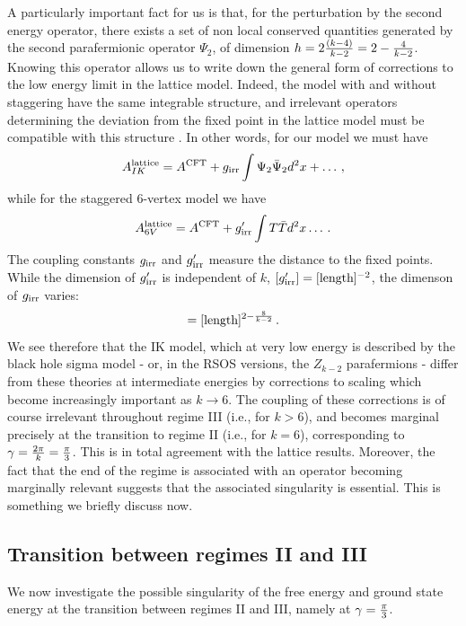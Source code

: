 \documentclass[11pt]{article}
\begin{document}
A particularly important fact for us is that, for the perturbation by the second energy operator, there exists a set of non local conserved quantities generated by the second parafermionic operator $\Psi_2$, of dimension $h=2{(k-4)\over k-2}=2-{4\over k-2}$. Knowing this operator allows us to write down the general form of corrections to the low energy limit in the lattice model. Indeed, the model with and without staggering have the same integrable structure, and irrelevant  operators determining the deviation from the fixed point in the lattice model must be compatible with this structure \cite{Lukyanov}. In other words, for our model we must have
%
\begin{equation}
A^{\rm lattice}_{IK}=A^{\rm CFT}+g_{\rm irr}\int \Psi_2\bar{\Psi}_2d^2x+\ldots \,,
\end{equation}
%
while for the staggered 6-vertex model we have 
%
\begin{equation}
A^{\rm lattice}_{6V}=A^{\rm CFT}+g'_{\rm irr}\int T\bar{T} d^2x\ldots \,.
\end{equation}
%
The coupling constants $g_{\rm irr}$ and $g_{\rm irr}'$ measure the distance to the fixed points. While the dimension of $g'_{\rm irr}$ is independent of $k$, $[g'_{\rm irr}]=[\hbox{length}]^{-2}$, the dimenson of $g_{\rm irr}$ varies:
%
\begin{equation}
[g_{\rm irr}]=[\hbox{length}]^{2-{8\over k-2}} \,. \label{girrscal}
\end{equation}
%
We see therefore that the IK model, which at very low energy is described by the black hole sigma model - or, in the RSOS versions, the $Z_{k-2}$ parafermions - differ from these theories at intermediate energies by corrections to scaling which become increasingly important as $k\to 6$. The coupling of these corrections  is  of course irrelevant throughout regime III (i.e., for $k > 6$), and becomes marginal precisely at the transition to regime II (i.e., for $k=6$), corresponding to $\gamma={2 \pi \over k}={\pi \over 3}$. This is in total agreement with the lattice results. 
Moreover, the fact that the end of the regime is associated with an operator becoming marginally relevant suggests that the associated singularity is essential. This is something we briefly discuss now.

\subsection{Transition between regimes II and III}

We now investigate the possible singularity of the free energy and ground state energy at the transition between regimes II and III, namely at $\gamma = {\pi \over 3}$. 
\end{document}
